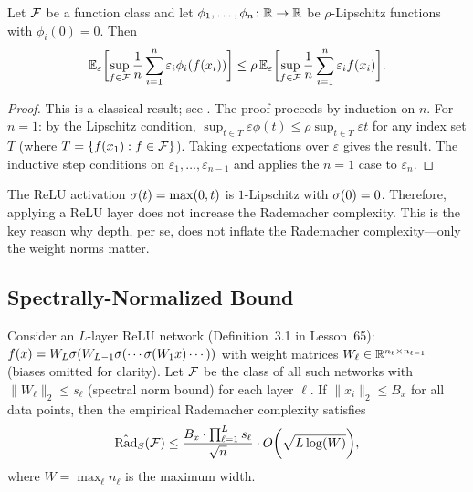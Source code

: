 \documentclass[11pt,a4paper]{article}
\begin{document}
\begin{lemma}
\label{lem:contraction}
Let $\mathcal{F}$ be a function class and let $\phi_1, \ldots, \phi_n
\colon \mathbb{R} \to \mathbb{R}$ be $\rho$-Lipschitz functions with $\phi_i(0) = 0$.
Then
\[
  \mathbb{E}_\varepsilon\biggl[ \sup_{f \in \mathcal{F}} \frac{1}{n}
    \sum_{i=1}^n \varepsilon_i \phi_i(f(x_i)) \biggr]
  \le \rho \, \mathbb{E}_\varepsilon\biggl[ \sup_{f \in \mathcal{F}}
    \frac{1}{n} \sum_{i=1}^n \varepsilon_i f(x_i) \biggr].
\]
\end{lemma}

\begin{proof}
This is a classical result; see \citet[Theorem~4.12]{ledoux1991}.
The proof proceeds by induction on $n$.  For $n = 1$: by the
Lipschitz condition,
$\sup_{t \in T} \varepsilon \phi(t) \le \rho \sup_{t \in T}
\varepsilon t$ for any index set $T$ (where $T = \{f(x_1) :
f \in \mathcal{F}\}$).  Taking expectations over $\varepsilon$
gives the result.  The inductive step conditions on
$\varepsilon_1, \ldots, \varepsilon_{n-1}$ and applies the
$n = 1$ case to $\varepsilon_n$.
\end{proof}

\begin{remark}
\label{rem:relu-contraction}
The ReLU activation $\sigma(t) = \max(0, t)$ is $1$-Lipschitz with
$\sigma(0) = 0$.  Therefore, applying a ReLU layer does not increase
the Rademacher complexity.  This is the key reason why depth, per se,
does not inflate the Rademacher complexity---only the weight norms
matter.
\end{remark}

\subsection{Spectrally-Normalized Bound}

\begin{theorem}
\label{thm:spectral-rad}
Consider an $L$-layer ReLU network (Definition~3.1 in Lesson~65):
$f(x) = W_L \sigma(W_{L-1} \sigma(\cdots \sigma(W_1 x)
\cdots))$
with weight matrices $W_\ell \in \mathbb{R}^{n_\ell \times n_{\ell-1}}$
(biases omitted for clarity).  Let $\mathcal{F}$ be the class of all
such networks with $\|W_\ell\|_2 \le s_\ell$ (spectral norm bound)
for each layer $\ell$.  If $\|x_i\|_2 \le B_x$ for all data points,
then the empirical Rademacher complexity satisfies
\begin{equation}
\label{eq:spectral-bound}
  \hat{\mathrm{Rad}}_S(\mathcal{F}) \le
  \frac{B_x \cdot \prod_{\ell=1}^{L} s_\ell}{\sqrt{n}}
  \cdot O\biggl( \sqrt{L \log(W)} \biggr),
\end{equation}
where $W = \max_\ell n_\ell$ is the maximum width.
\end{theorem}
\end{document}
